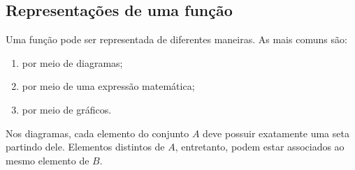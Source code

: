 \subsection{Representações de uma função}

Uma função pode ser representada de diferentes maneiras. As mais comuns são:

\begin{enumerate}
    \item[(i)] por meio de diagramas;
    \item[(ii)] por meio de uma expressão matemática;
    \item[(iii)] por meio de gráficos.
\end{enumerate}

Nos diagramas, cada elemento do conjunto $A$ deve possuir exatamente uma seta partindo dele. Elementos distintos de $A$, entretanto, podem estar associados ao mesmo elemento de $B$.

